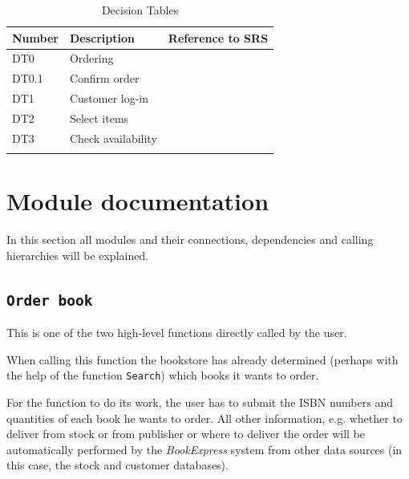 \begin{longtable}[l]{|p{}|p{}|p{}|}
\hline
Number & Description & Reference to SRS  \\
\hline
\hline

DT0 & Ordering & \\
\hline
DT0.1 & Confirm order & \\
\hline
DT1 & Customer log-in & \\
\hline
DT2 & Select items & \\
\hline
DT3 & Check availability & \\
\hline

\caption{Decision Tables}
\end{longtable}


\chapter{Module documentation}
In this section all modules and their connections, dependencies and calling hierarchies will be explained.

\section{\texttt{Order book}}
This is one of the two high-level functions directly called by the user.

When calling this function the bookstore has already determined (perhaps with the help of the function \texttt{Search})
which books it wants to order.

For the function to do its work, the user has to submit the ISBN numbers and quantities of each book he wants to order.
All other information, e.g. whether to deliver from stock or from publisher or where to deliver the order will be automatically
performed by the \emph{BookExpress} system from other data sources (in this case, the stock and customer databases).

